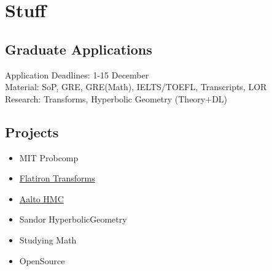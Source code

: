 \section{Stuff}

\subsection{Graduate Applications}

\noindent Application Deadlines: 1-15 December\\
\noindent Material: SoP, GRE, GRE(Math), IELTS/TOEFL, Transcripts, LOR\\
\noindent Research: Transforms, Hyperbolic Geometry (Theory+DL)\\[0.3cm]

\subsection{Projects}

\begin{itemize}
    \item MIT Probcomp
    \item \hyperref[sec:transforms]{Flatiron Transforms}
    \item \hyperref[sec:aalto-hmc]{Aalto HMC}
    \item Sandor HyperbolicGeometry
    \item Studying Math
    \item OpenSource
\end{itemize}


